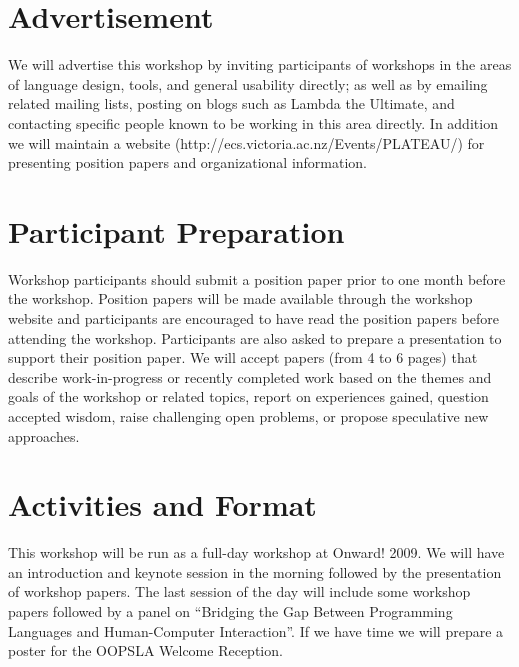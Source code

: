 \documentclass[9pt]{sigplanconf}
\begin{document}
\section{Advertisement}

We will advertise this workshop by inviting participants of workshops
in the areas of language design, tools, and general usability
directly; as well as by emailing related mailing lists, posting on
blogs such as Lambda the Ultimate, and contacting specific people
known to be working in this area directly. In addition we will
maintain a website (http://ecs.victoria.ac.nz/Events/PLATEAU/) for
presenting position papers and organizational information.

\section{Participant Preparation}

Workshop participants should submit a position paper prior to one
month before the workshop. Position papers will be made available
through the workshop website and participants are encouraged to have
read the position papers before attending the workshop. Participants
are also asked to prepare a presentation to support their position
paper. We will accept papers (from 4 to 6 pages) that describe
work-in-progress or recently completed work based on the themes and
goals of the workshop or related topics, report on experiences gained,
question accepted wisdom, raise challenging open problems, or propose
speculative new approaches.

\section{Activities and Format}

This workshop will be run as a full-day workshop at Onward! 2009.  We
will have an introduction and keynote session in the morning followed
by the presentation of workshop papers.  The last session of the day
will include some workshop papers followed by a panel on ``Bridging
the Gap Between Programming Languages and Human-Computer
Interaction''. If we have time we will prepare a poster for the
OOPSLA Welcome Reception.  
\end{document}
